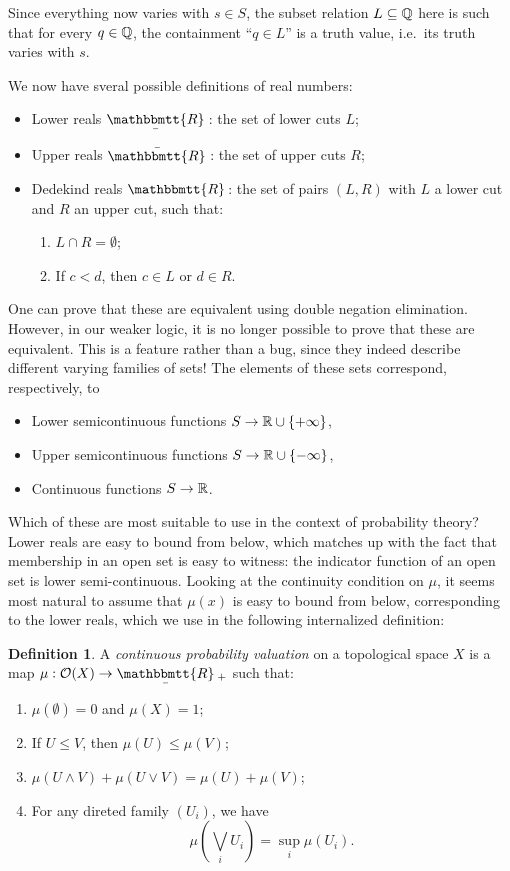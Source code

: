 \documentclass[11pt, oneside, article]{memoir}
\theoremstyle{plain}
\theoremstyle{definition}
\newtheorem{definition}[theorem]{Definition}
\theoremstyle{remark}
\newcommand{\ubar}[1]{\underaccent{\bar}{#1}}
\newcommand{\internal}[1]{\raisebox{-.03ex}{$\mathbbmtt{#1}$}}
\newcommand{\hs}{\hspace{1.1pt}}
\newcommand{\tRR}{\internal{R}\hs}
\newcommand{\tLR}{\ubar{\tRR}\hs}
\newcommand{\tUR}{\bar{\tRR}\hs}
\begin{document}
Since everything now varies with $s\in S$, the subset relation $L \subseteq \mathbb{Q}$ here is such that for every $q\in\mathbb{Q}$, the containment ``$q\in L$'' is a truth value, i.e.~its truth varies with $s$.

We now have sveral possible definitions of real numbers:

\begin{itemize}
\item Lower reals $\tLR$: the set of lower cuts $L$;
\item Upper reals $\tUR$: the set of upper cuts $R$;
\item Dedekind reals $\tRR$: the set of pairs $(L,R)$ with $L$ a lower cut and $R$ an upper cut, such that:
\begin{enumerate}
\item $L \cap R = \emptyset$;
\item If $c < d$, then $c\in L$ or $d\in R$.
\end{enumerate}
\end{itemize}

One can prove that these are equivalent using double negation elimination. However, in our weaker logic, it is no longer possible to prove that these are equivalent. This is a feature rather than a bug, since they indeed describe different varying families of sets! The elements of these sets correspond, respectively, to

\begin{itemize}
\item Lower semicontinuous functions $S \to \mathbb{R} \cup \{+\infty\}$,
\item Upper semicontinuous functions $S \to \mathbb{R} \cup \{-\infty\}$,
\item Continuous functions $S \to \mathbb{R}$.
\end{itemize}

Which of these are most suitable to use in the context of probability theory? Lower reals are easy to bound from below, which matches up with the fact that membership in an open set is easy to witness: the indicator function of an open set is lower semi-continuous. Looking at the continuity condition on $\mu$, it seems most natural to assume that $\mu(x)$ is easy to bound from below, corresponding to the lower reals, which we use in the following internalized definition:

\begin{definition}
A \emph{continuous probability valuation} on a topological space $X$ is a map $\mu : \Open{X} \to \tLR_+$ such that:
\begin{enumerate}
\item $\mu(\emptyset) = 0$ and $\mu(X) = 1$;
\item If $U\leq V$, then $\mu(U) \leq \mu(V)$;
\item $\mu(U \land V) + \mu(U \lor V) = \mu(U) + \mu(V)$;
\item For any direted family $(U_i)$, we have
\[
	\mu\left( \bigvee_i U_i \right) = \sup_i \mu(U_i).
\]
\end{enumerate}
\end{definition}
\end{document}
